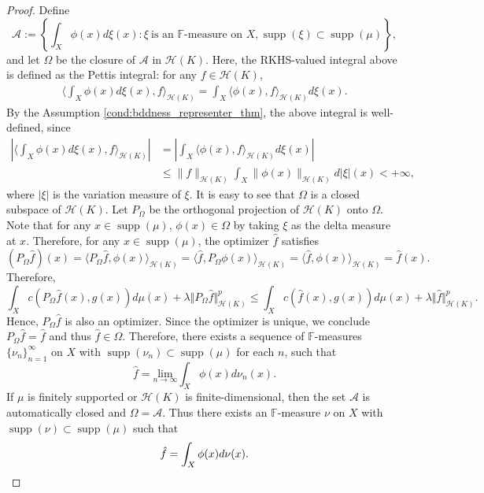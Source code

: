 \documentclass{amsart}
\numberwithin{equation}{section}
\DeclareMathOperator{\supp}{supp}
\theoremstyle{plain}
\theoremstyle{remark}
\theoremstyle{definition}
\begin{document}
\begin{proof}
Define
    \begin{equation*}
        \mathscr{A}:=\left\{\int_{X} \phi(x) d\xi(x): \xi \ \text{is an $\mathbb{F}$-measure on $X$}, \supp(\xi) \subset \supp(\mu) \right \},
    \end{equation*}
    and let $\Omega$ be the closure of $\mathscr{A}$ in $\mathscr{H}(K)$. Here, the RKHS-valued integral above is defined as the Pettis integral: for any $f \in \mathscr{H}(K)$,  
     \begin{align*}
            \langle \int_{X} \phi(x) d\xi(x), f \rangle_{\mathscr{H}(K)} 
    =\int_{X} \langle \phi(x), f \rangle_{\mathscr{H}(K)} d\xi(x). %
    \end{align*}
    By the Assumption \ref{cond:bddness_representer_thm}, the above integral is well-defined, since
    \begin{align*}
            \left|\langle \int_{X} \phi(x) d\xi(x), f \rangle_{\mathscr{H}(K)} \right|
    &=\left|\int_{X} \langle \phi(x), f \rangle_{\mathscr{H}(K)} d\xi(x)\right| \\
    &\leq \|f\|_{\mathscr{H}(K)}\int_{X} \|\phi(x)\|_{\mathscr{H}(K)} d|\xi|(x) < +\infty,
    \end{align*}
where $\vert \xi \vert$ is the variation measure of $\xi$. 
It is easy to see that $\Omega$ is a closed subspace of $ \mathscr{H}(K)$. Let $P_\Omega$ be the orthogonal projection of $ \mathscr{H}(K)$ onto $\Omega$. 
Note that for any $x \in \supp(\mu)$, $\phi(x) \in \Omega$ by taking $\xi$ as the delta measure at $x$.  Therefore, for any $x \in \supp(\mu)$, the optimizer $\hat{f}$ satisfies
\begin{equation*}
    (P_\Omega \hat{f})(x) = \langle P_\Omega \hat{f}, \phi(x) \rangle_{\mathscr{H}(K)} = \langle  \hat{f}, P_\Omega \phi(x) \rangle_{\mathscr{H}(K)} = \langle  \hat{f},  \phi(x) \rangle_{\mathscr{H}(K)} =  \hat{f}(x).
\end{equation*}
Therefore, 
  \begin{equation*}
   \int_{X} c( P_\Omega \hat{f}(x), g(x))  d\mu(x) + \lambda \Vert P_\Omega \hat{f} \Vert^p_{\mathscr{H}(K)} \leq  \int_{X} c( \hat{f}(x), g(x))  d\mu(x) + \lambda  \Vert \hat{f} \Vert^p_{\mathscr{H}(K)}.
\end{equation*}
Hence, $P_\Omega \hat{f}$ is also an optimizer.
Since the optimizer is unique,  we conclude $P_\Omega \hat{f}= \hat{f}$ and thus $\hat{f} \in \Omega$. Therefore, there exists a sequence of $\mathbb{F}$-measures $\{\nu_n\}_{n=1}^{\infty}$ on $X$ with  $\supp(\nu_n) \subset \supp(\mu)$ for each $n$, such that 
\begin{equation*}
    \hat{f} = \underset{n \rightarrow \infty}{\text{lim}}\int_{X} \phi(x) d\nu_n(x).
\end{equation*} 
If $\mu$ is finitely supported or $\mathscr{H}(K)$ is finite-dimensional, then the set $\mathscr{A}$ is automatically closed and $\Omega = \mathscr{A}$.
Thus there exists an $\mathbb{F}$-measure $\nu$ on $X$ with  $\supp(\nu) \subset \supp(\mu)$ such that 
\begin{equation*}
    \hat{f} = \int_{X} \phi(x) d\nu(x). \qedhere
\end{equation*} 
\end{proof}
\end{document}
